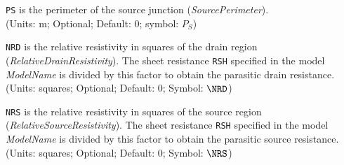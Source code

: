 \begin{widelist}
\item[{\tt PS}]  is the perimeter of the source junction
               ({\it SourcePerimeter}).\\
               (Units: m; Optional; Default: 0; symbol: $P_S$)

\item[{\tt NRD}]  is  the  relative resistivity in squares of the drain region
               ({\it RelativeDrainResistivity}).
               The sheet resistance {\tt RSH} specified in the model {\it
           ModelName} is divided  by this factor to obtain the
           parasitic drain resistance.\\
           (Units: squares; Optional; Default: 0; Symbol: $\NRD$)

\item[{\tt NRS}]  is  the  relative resistivity in squares of the source region
               ({\it RelativeSourceResistivity}).
               The sheet resistance {\tt RSH} specified in the model {\it
           ModelName} is divided  by this factor to obtain the
           parasitic source resistance.\\
           (Units: squares; Optional; Default: 0; Symbol: $\NRS$)
\end{widelist}

